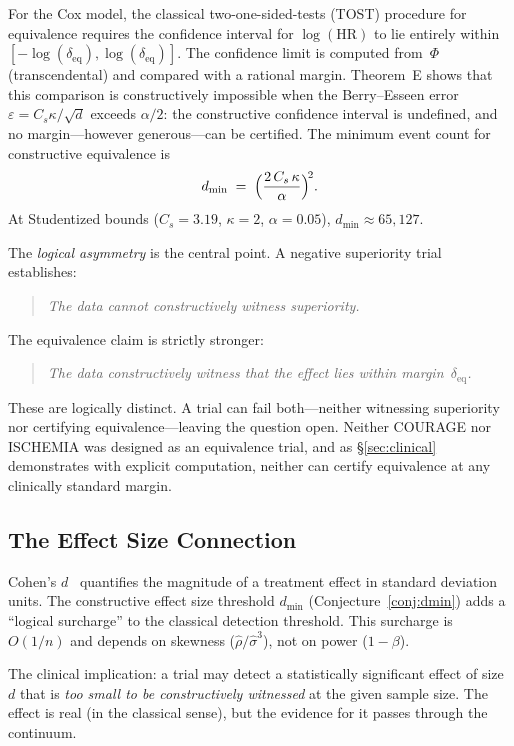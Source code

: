 \documentclass[11pt,a4paper]{article}
\theoremstyle{plain}
\theoremstyle{definition}
\renewcommand{\Phi}{\varPhi}
\begin{document}
For the Cox model, the classical two-one-sided-tests (TOST) procedure for equivalence requires the confidence interval for $\log(\mathrm{HR})$ to lie entirely within $[-\log(\delta_{\mathrm{eq}}), \log(\delta_{\mathrm{eq}})]$.  The confidence limit is computed from~$\Phi$ (transcendental) and compared with a rational margin.  Theorem~E shows that this comparison is constructively impossible when the Berry--Esseen error $\varepsilon = C_s\kappa/\sqrt{d}$ exceeds $\alpha/2$: the constructive confidence interval is undefined, and no margin---however generous---can be certified.  The minimum event count for constructive equivalence is
\[
  d_{\min} \;=\; \Bigl(\frac{2\,C_s\,\kappa}{\alpha}\Bigr)^{\!2}.
\]
At Studentized bounds ($C_s = 3.19$, $\kappa = 2$, $\alpha = 0.05$), $d_{\min} \approx 65{,}127$.

The \emph{logical asymmetry} is the central point.  A negative superiority trial establishes:
\begin{quote}
\emph{The data cannot constructively witness superiority.}
\end{quote}
\noindent The equivalence claim is strictly stronger:
\begin{quote}
\emph{The data constructively witness that the effect lies within margin~$\delta_{\mathrm{eq}}$.}
\end{quote}
\noindent These are logically distinct.  A trial can fail both---neither witnessing superiority nor certifying equivalence---leaving the question open.  Neither COURAGE nor ISCHEMIA was designed as an equivalence trial, and as \S\ref{sec:clinical} demonstrates with explicit computation, neither can certify equivalence at any clinically standard margin.

\subsection{The Effect Size Connection}

Cohen's $d$~\cite{cohen1988} quantifies the magnitude of a treatment effect in standard deviation units.  The constructive effect size threshold $d_{\min}$ (Conjecture~\ref{conj:dmin}) adds a ``logical surcharge'' to the classical detection threshold.  This surcharge is $O(1/n)$ and depends on skewness ($\hat\rho/\hat\sigma^3$), not on power ($1-\beta$).

The clinical implication: a trial may detect a statistically significant effect of size $d$ that is \emph{too small to be constructively witnessed} at the given sample size.  The effect is real (in the classical sense), but the evidence for it passes through the continuum.
\end{document}
